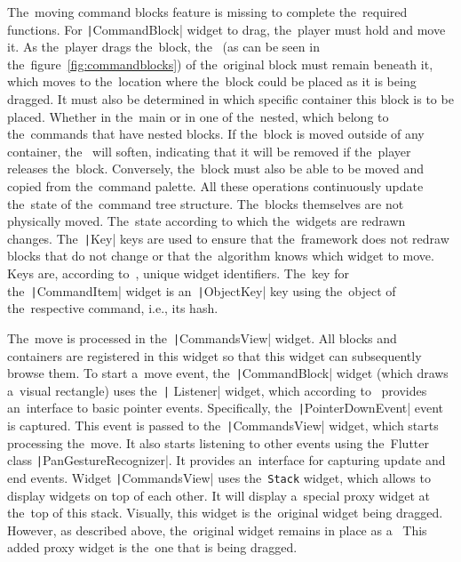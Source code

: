 The~moving command blocks feature is missing to complete the~required functions.
For \texttt|CommandBlock| widget to drag, the~player must hold and move it.
As the~player drags the~block, the~ (as can be seen in the~figure~\ref{fig:commandblocks}) of the~original block must remain beneath it, which moves to the~location where the~block could be placed as it is being dragged.
It must also be determined in which specific container this block is to be placed.
Whether in the~main or in one of the~nested, which belong to the~commands that have nested blocks.
If the~block is moved outside of any container, the~ will soften, indicating that it will be removed if the~player releases the~block.
Conversely, the~block must also be able to be moved and copied from the~command palette.
All these operations continuously update the~state of the~command tree structure.
The~blocks themselves are not physically moved.
The~state according to which the~widgets are redrawn changes.
The~\texttt|Key| keys are used to ensure that the~framework does not redraw blocks that do not change or that the~algorithm knows which widget to move.
Keys are, according to~\cite{a2022_material}, unique widget identifiers.
The~key for the~\texttt|CommandItem| widget is an~\texttt|ObjectKey| key using the~object of the~respective command, i.e., its hash.

The~move is processed in the~\texttt|CommandsView| widget.
All blocks and containers are registered in this widget so that this widget can subsequently browse them.
To start a~move event, the~\texttt|CommandBlock| widget (which draws a~visual rectangle) uses the~\texttt| Listener| widget, which according to~\cite{a2022_material} provides an~interface to basic pointer events.
Specifically, the~\texttt|PointerDownEvent| event is captured.
This event is passed to the~\texttt|CommandsView| widget, which starts processing the~move.
It also starts listening to other events using the~Flutter class \texttt|PanGestureRecognizer|.
It provides an~interface for capturing update and end events.
Widget \texttt|CommandsView| uses the~\mintinline {text}|Stack| widget, which allows to display widgets on top of each other.
It will display a~special proxy widget at the~top of this stack.
Visually, this widget is the~original widget being dragged.
However, as described above, the~original widget remains in place as a~
This added proxy widget is the~one that is being dragged.

